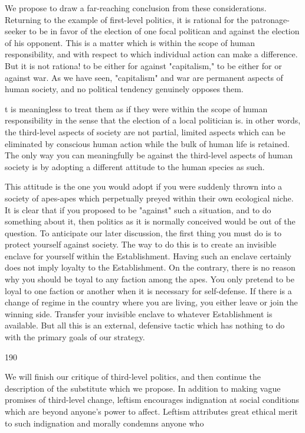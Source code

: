 \documentclass[10pt,twoside]{memoir}
\begin{document}
\begin{enumerate}
{{{We propose to draw a far-reaching conclusion from these 
considerations. Returning to the example of first-level politics, it is rational 
for the patronage-seeker to be in favor of the election of one focal politican 
and against the election of his opponent. This is a matter which is within the 
scope of human responsibility, and with respect to which individual action 
can make a difference. But it is not rationa! to be either for against 
"capitalism," to be either for or against war. As we have seen, "capitalism" 
and war are permanent aspects of human society, and no political tendency 
genuinely opposes them. {t is meaningless to treat them as if they were 
within the scope of human responsibility in the sense that the election of a 
local politician is. in other words, the third-level aspects of society are not 
partial, limited aspects which can be eliminated by conscious human action 
while the bulk of human life is retained. The only way you can meaningfully 
be against the third-level aspects of human society is by adopting a different 
attitude to the human species as such. 

This attitude is the one you would adopt if you were suddenly thrown 
into a society of apes-apes which perpetually preyed within their own 
ecological niche. It is clear that if you proposed to be "against" such a 
situation, and to do something about it, then politics as it is normally 
conceived would be out of the question. To anticipate our later discussion, 
the first thing you must do is to protect yourself against society. The way to 
do this is to create an invisible enclave for yourself within the Establishment. 
Having such an enclave certainly does not imply loyalty to the 
Establishment. On the contrary, there is no reason why you should be toyal 
to any faction among the apes. You only pretend to be loyal to one faction 
or another when it is necessary for self-defense. If there is a change of regime 
in the country where you are living, you either leave or join the winning side. 
Transfer your invisible enclave to whatever Establishment is available. But all 
this is an external, defensive tactic which has nothing to do with the primary 
goals of our strategy. 


190 


We will finish our critique of third-level politics, and then continue the 
description of the substitute which we propose. In addition to making vague 
promises of third-level change, leftism encourages indignation at social 
conditions which are beyond anyone's power to affect. Leftism attributes 
great ethical merit to such indignation and morally condemns anyone who 


}}}}
\end{enumerate}
\end{document}
